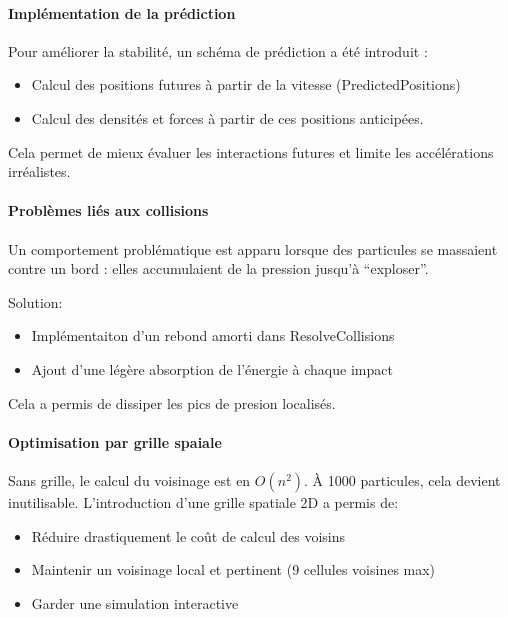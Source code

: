 \documentclass{article}
\begin{document}
\paragraph{Implémentation de la prédiction}

Pour améliorer la stabilité, un schéma de prédiction a été introduit :

\begin{itemize}
    \item Calcul des positions futures à partir de la vitesse (PredictedPositions)
    \item Calcul des densités et forces à partir de ces positions anticipées.
\end{itemize}

Cela permet de mieux évaluer les interactions futures et limite les accélérations irréalistes.

\paragraph{Problèmes liés aux collisions}

Un comportement problématique est apparu lorsque des particules se massaient contre un bord : elles accumulaient de la pression jusqu’à ``exploser''.

Solution:

\begin{itemize}
    \item Implémentaiton d'un rebond amorti dans ResolveCollisions
    \item Ajout d'une légère absorption de l'énergie à chaque impact
\end{itemize}

Cela a permis de dissiper les pics de presion localisés.

\paragraph{Optimisation par grille spaiale}

Sans grille, le calcul du voisinage est en \(O(n^2)\). À 1000 particules, cela devient inutilisable. L’introduction d’une grille spatiale 2D a permis de:

\begin{itemize}
    \item Réduire drastiquement le coût de calcul des voisins
    \item Maintenir un voisinage local et pertinent (9 cellules voisines max)
    \item Garder une simulation interactive
\end{itemize}
\end{document}
